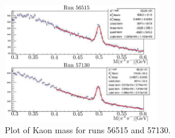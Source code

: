 \begin{figure}\begin{center}
\includegraphics[width=0.6\textwidth]{figures/calib/tag/ecor/Kaon_mass.eps}
\caption[Kaon Mass for Run 56515 and 57130]{\label{fig:beamcor.k_mass}Plot of Kaon mass for runs 56515 and 57130.}
\end{center}\end{figure}

\FloatBarrier

